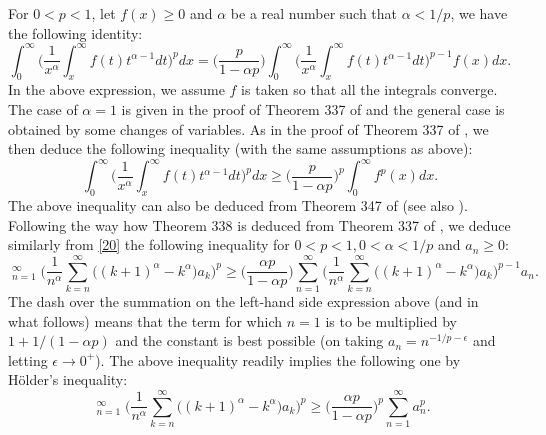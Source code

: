 \documentclass[11pt]{amsart}
\numberwithin{equation}{section}
\theoremstyle{definition}
\theoremstyle{remark}
\begin{document}
   For $0<p<1$, let $f(x) \geq 0$ and $\alpha$ be a real number such that $\alpha <1/p$, we have the following
   identity:
\begin{equation}
\label{20}
   \int^{\infty}_{0}\Big (\frac
   {1}{x^{\alpha}}\int^{\infty}_xf(t)t^{\alpha-1}dt
   \Big)^pdx=\Big (\frac {p}{1-\alpha p} \Big )\int^{\infty}_0\Big
   (\frac {1}{x^{\alpha}}\int^{\infty}_{x}f(t)t^{\alpha-1}dt\Big
   )^{p-1}f(x)dx.
\end{equation}
   In the above expression, we assume $f$ is taken so that all the integrals converge. The case of $\alpha=1$ is given in the proof of Theorem
   337 of \cite{HLP} and the general case is obtained by some
   changes of variables. As in the proof of Theorem 337 of
   \cite{HLP}, we then deduce the following inequality (with the same assumptions as above):
\begin{equation*}
   \int^{\infty}_{0}\Big (\frac
   {1}{x^{\alpha}}\int^{\infty}_xf(t)t^{\alpha-1}dt
   \Big)^pdx \geq \Big (\frac {p}{1-\alpha p} \Big )^p\int^{\infty}_0f^p(x)dx.
\end{equation*}
  The above inequality can also be deduced from Theorem 347 of
  \cite{HLP} (see also \cite[(2.4)]{G5}).
   Following the way how Theorem 338 is deduced from Theorem 337 of \cite{HLP}, we deduce similarly from \eqref{20} the following
   inequality for $0<p<1, 0< \alpha <1/p$ and $a_n \geq 0$:
\begin{equation*}
   {\mathop{{\sum}^{'}}}^{\infty}_{n=1} \Big( \frac 1{n^{\alpha}} \sum^{\infty}_{k=n}\Big((k+1)^{\alpha}-k^{\alpha}\Big )a_k \Big
  )^p \geq \Big ( \frac {\alpha p}{1-\alpha p} \Big )
  \sum^{\infty}_{n=1}\Big( \frac 1{n^{\alpha}} \sum^{\infty}_{k=n}\Big((k+1)^{\alpha}-k^{\alpha}\Big )a_k \Big
  )^{p-1}a_n.
\end{equation*}
  The dash over the summation on the left-hand side expression above (and in
what follows) means that
   the term for which $n=1$ is to be multiplied by $1+1/(1-\alpha p)$ and
   the constant is best possible (on taking $a_n=n^{-1/p-\epsilon}$ and letting $\epsilon \rightarrow 0^+$).
   The above inequality readily implies the following one by H\"older's
   inequality:
\begin{equation*}
\   {\mathop{{\sum}^{'}}}^{\infty}_{n=1} \Big( \frac 1{n^{\alpha}}
\sum^{\infty}_{k=n}\Big((k+1)^{\alpha}-k^{\alpha}\Big )a_k \Big
  )^p \geq \Big ( \frac {\alpha p}{1-\alpha p} \Big )^p \sum^{\infty}_{n=1}a^p_n.
\end{equation*}
\end{document}
